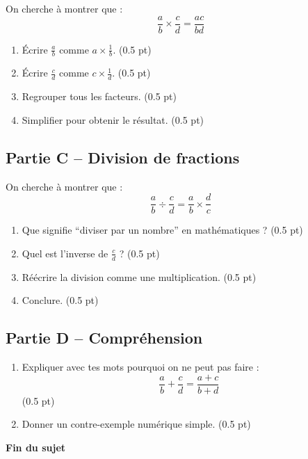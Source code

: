 \documentclass[11pt,a4paper]{article}
\begin{document}
On cherche à montrer que :
\[
\frac{a}{b} \times \frac{c}{d} = \frac{ac}{bd}
\]

\begin{enumerate}
\item Écrire $\frac{a}{b}$ comme $a \times \frac{1}{b}$. \hfill (0.5 pt)

\item Écrire $\frac{c}{d}$ comme $c \times \frac{1}{d}$. \hfill (0.5 pt)

\item Regrouper tous les facteurs. \hfill (0.5 pt)

\item Simplifier pour obtenir le résultat. \hfill (0.5 pt)

\end{enumerate}

\vspace{0.3cm}

\subsection*{Partie C -- Division de fractions}

On cherche à montrer que :
\[
\frac{a}{b} \div \frac{c}{d} = \frac{a}{b} \times \frac{d}{c}
\]

\begin{enumerate}
\item Que signifie ``diviser par un nombre'' en mathématiques ? \hfill (0.5 pt)

\item Quel est l’inverse de $\frac{c}{d}$ ? \hfill (0.5 pt)

\item Réécrire la division comme une multiplication. \hfill (0.5 pt)

\item Conclure. \hfill (0.5 pt)

\end{enumerate}

\vspace{0.3cm}

\subsection*{Partie D -- Compréhension}

\begin{enumerate}
\item Expliquer avec tes mots pourquoi on ne peut pas faire :
\[
\frac{a}{b} + \frac{c}{d} = \frac{a+c}{b+d}
\] \hfill (0.5 pt)

\item Donner un contre-exemple numérique simple. \hfill (0.5 pt)

\end{enumerate}

\vspace{1cm}

\begin{center}
\textbf{Fin du sujet}
\end{center}
\end{document}
